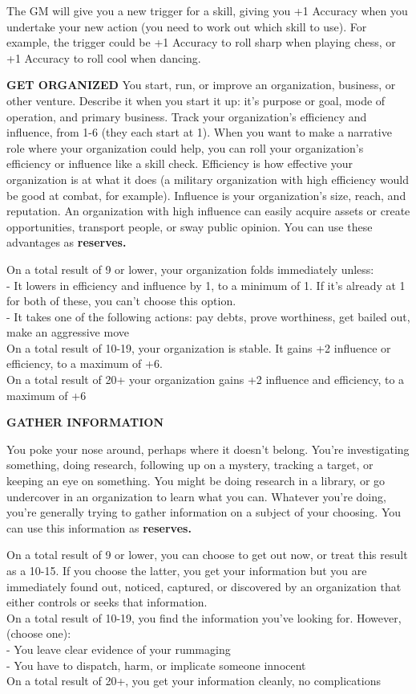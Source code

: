 The GM will give you a new trigger for a skill, giving you +1 Accuracy when you undertake your new action (you need to work out which skill to use). For example, the trigger could be +1 Accuracy to roll sharp when playing chess, or +1 Accuracy to roll cool when dancing.

\textbf{GET ORGANIZED}
You start, run, or improve an organization, business, or other venture. Describe it when you start it up: it’s purpose or goal, mode of operation, and primary business. Track your organization’s efficiency and influence, from 1-6 (they each start at 1). When you want to make a narrative role where your organization could help, you can roll your organization’s efficiency or influence like a skill check. Efficiency is how effective your organization is at what it does (a military organization with high efficiency would be good at combat, for example). Influence is your organization’s size, reach, and reputation. An organization with high influence can easily acquire assets or create opportunities, transport people, or sway public opinion. You can use these advantages as \textbf{reserves.} 

On a total result of 9 or lower, your organization folds immediately unless:\\
-    It lowers in efficiency and influence by 1, to a minimum of 1. If it’s already at 1 for both of these, you can’t choose this option.\\
-    It takes one of the following actions: pay debts, prove worthiness, get bailed out, make an aggressive move\\
On a total result of 10-19, your organization is stable. It gains +2 influence or efficiency, to a maximum of +6.\\
On a total result of 20+ your organization gains +2 influence and efficiency, to a maximum of +6

\textbf{GATHER INFORMATION}

You poke your nose around, perhaps where it doesn’t belong. You’re investigating something, doing research, following up on a mystery, tracking a target, or keeping an eye on something. You might be doing research in a library, or go undercover in an organization to learn what you can. Whatever you’re doing, you’re generally trying to gather information on a subject of your choosing. You can use this information as \textbf{reserves.} 

On a total result of 9 or lower, you can choose to get out now, or treat this result as a 10-15. If you choose the latter, you get your information but you are immediately found out, noticed, captured, or discovered by an organization that either controls or seeks that information.\\
On a total result of 10-19, you find the information you’ve looking for. However, (choose one):\\
-    You leave clear evidence of your rummaging\\
-    You have to dispatch, harm, or implicate someone innocent\\
On a total result of 20+, you get your information cleanly, no complications

